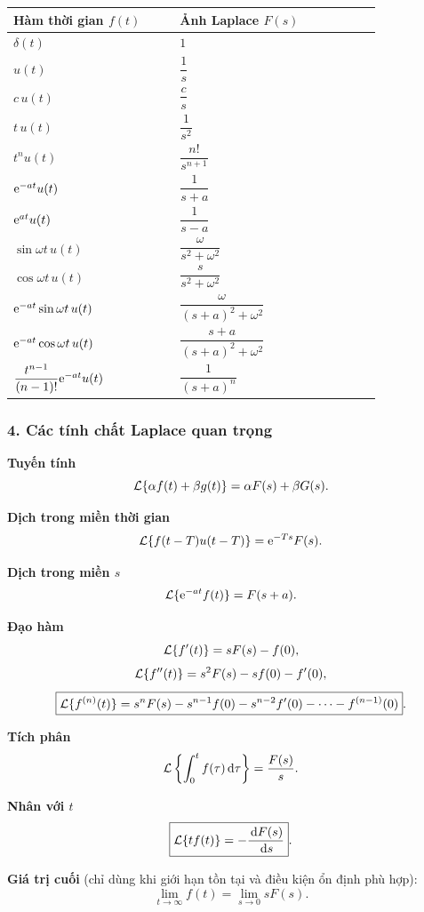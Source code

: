 \begin{center}
\begin{tabular}{|p{0.38\linewidth}|p{0.46\linewidth}|}
\hline
\textbf{Hàm thời gian $f(t)$} & \textbf{Ảnh Laplace $F(s)$} \\ \hline
$\delta(t)$ & $1$ \\ \hline
$u(t)$ & $\dfrac{1}{s}$ \\ \hline
$c\,u(t)$ & $\dfrac{c}{s}$ \\ \hline
$t\,u(t)$ & $\dfrac{1}{s^2}$ \\ \hline
$t^n u(t)$ & $\dfrac{n!}{s^{n+1}}$ \\ \hline
$\mathrm{e}^{-at}u(t)$ & $\dfrac{1}{s+a}$ \\ \hline
$\mathrm{e}^{at}u(t)$ & $\dfrac{1}{s-a}$ \\ \hline
$\sin\omega t\,u(t)$ & $\dfrac{\omega}{s^2+\omega^2}$ \\ \hline
$\cos\omega t\,u(t)$ & $\dfrac{s}{s^2+\omega^2}$ \\ \hline
$\mathrm{e}^{-at}\sin\omega t\,u(t)$ & $\dfrac{\omega}{(s+a)^2+\omega^2}$ \\ \hline
$\mathrm{e}^{-at}\cos\omega t\,u(t)$ & $\dfrac{s+a}{(s+a)^2+\omega^2}$ \\ \hline
$\dfrac{t^{n-1}}{(n-1)!}\mathrm{e}^{-at}u(t)$ & $\dfrac{1}{(s+a)^n}$ \\ \hline
\end{tabular}
\end{center}

\subsubsection*{4. Các tính chất Laplace quan trọng}

\textbf{Tuyến tính}
\[
\mathcal{L}\{\alpha f(t)+\beta g(t)\}=\alpha F(s)+\beta G(s).
\]

\textbf{Dịch trong miền thời gian}
\[
\mathcal{L}\{f(t-T)u(t-T)\}=\mathrm{e}^{-Ts}F(s).
\]

\textbf{Dịch trong miền $s$}
\[
\mathcal{L}\{\mathrm{e}^{-at}f(t)\}=F(s+a).
\]

\textbf{Đạo hàm}
\[
\mathcal{L}\{f'(t)\}=sF(s)-f(0),
\]
\[
\mathcal{L}\{f''(t)\}=s^2F(s)-sf(0)-f'(0),
\]
\[
\boxed{
\mathcal{L}\{f^{(n)}(t)\}
=
s^nF(s)-s^{n-1}f(0)-s^{n-2}f'(0)-\cdots-f^{(n-1)}(0)
}.
\]

\textbf{Tích phân}
\[
\mathcal{L}\left\{\int_0^t f(\tau)\,\mathrm{d}\tau\right\}=\frac{F(s)}{s}.
\]

\textbf{Nhân với $t$}
\[
\boxed{\mathcal{L}\{t f(t)\}=-\frac{\,\mathrm{d} F(s)}{\,\mathrm{d} s}}.
\]

\textbf{Giá trị cuối} (chỉ dùng khi giới hạn tồn tại và điều kiện ổn định phù hợp):
\[
\boxed{\lim_{t\to\infty}f(t)=\lim_{s\to0}sF(s)}.
\]

